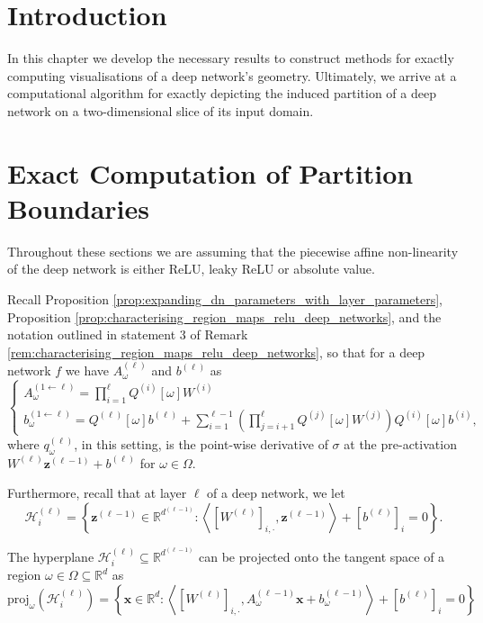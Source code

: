 \section{Introduction}

In this chapter we develop the necessary results to construct methods for exactly computing visualisations of a deep network's geometry. Ultimately, we arrive at a computational algorithm for exactly depicting the induced partition of a deep network on a two-dimensional slice of its input domain.  

\section{Exact Computation of Partition Boundaries}

Throughout these sections we are assuming that the piecewise affine non-linearity of the deep network is either ReLU, leaky ReLU or absolute value. 

Recall Proposition \ref{prop:expanding_dn_parameters_with_layer_parameters}, Proposition \ref{prop:characterising_region_maps_relu_deep_networks}, and the notation outlined in statement 3 of Remark \ref{rem:characterising_region_maps_relu_deep_networks}, so that for a deep network $f$ we have $A_{\omega}^{(\ell)}$ and $b^{(\ell)}$ as 
\begin{equation}\label{eq:mapping_on_regions_using_gradients}
    \begin{cases}
        A_{\omega}^{(1\leftarrow\ell)}=\prod_{i=1}^{\ell}Q^{(i)}[\omega]W^{(i)}\\b_{\omega}^{(1\leftarrow\ell)}=Q^{(\ell)}[\omega]b^{(\ell)}+\sum_{i=1}^{\ell-1}\left(\prod_{j=i+1}^{\ell}Q^{(j)}[\omega]W^{(j)}\right)Q^{(i)}[\omega]b^{(i)},
    \end{cases}
\end{equation}
where $q_{\omega}^{(\ell)}$, in this setting, is the point-wise derivative of $\sigma$ at the pre-activation $W^{(\ell)}\mathbf{z}^{(\ell-1)}+b^{(\ell)}$ for $\omega\in\Omega$.

Furthermore, recall that at layer $\ell$ of a deep network, we let $$\mathcal{H}^{(\ell)}_i=\left\{\mathbf{z}^{(\ell-1)}\in\mathbb{R}^{d^{(\ell-1)}}:\left\langle[W^{(\ell)}]_{i,\cdot},\mathbf{z}^{(\ell-1)}\right\rangle+\left[b^{(\ell)}\right]_i=0\right\}.$$

\begin{lemma}\label{lem:projection_hyperplane_to_input_space}
    The hyperplane $\mathcal{H}^{(\ell)}_i\subseteq\mathbb{R}^{d^{(\ell-1)}}$ can be projected onto the tangent space of a region $\omega\in\Omega\subseteq\mathbb{R}^d$ as $$\mathrm{proj}_{\omega}\left(\mathcal{H}^{(\ell)}_i\right)=\left\{\mathbf{x}\in\mathbb{R}^d:\left\langle\left[W^{(\ell)}\right]_{i,\cdot},A^{(\ell-1)}_{\omega}\mathbf{x}+b^{(\ell-1)}_{\omega}\right\rangle+\left[b^{(\ell)}\right]_i=0\right\}$$
\end{lemma}

